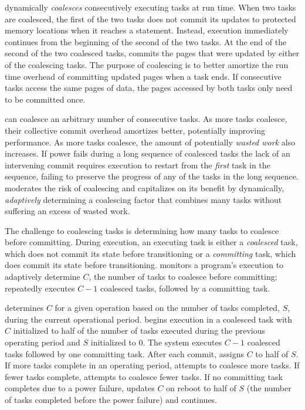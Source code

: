 \sys dynamically {\em coalesces} consecutively executing tasks at run time.
When two tasks are coalesced, the first of the two tasks does not commit its
updates to protected memory locations when it reaches a \transition statement.
Instead, execution immediately continues from the beginning of the second of
the two tasks. At the end of the second of the two coalesced tasks, \sys
commits the pages that were updated by either of the coalescing tasks. The
purpose of coalescing is to better amortize the run time overhead of committing
updated pages when a task ends. If consecutive tasks access the same pages of
data, the pages accessed by both tasks only need to be committed once.  

\sys can coalesce an arbitrary number of consecutive tasks. As more tasks
coalesce, their collective commit overhead amortizes better, potentially
improving performance. As more tasks coalesce, the amount of potentially {\em
wasted work} also increases. If power fails during a long sequence of coalesced
tasks the lack of an intervening commit requires execution to restart from the
{\em first} task in the sequence, failing to preserve the progress of any of
the tasks in the long sequence. \sys moderates the risk of coalescing and
capitalizes on its benefit by dynamically, \emph{adaptively} determining a
coalescing factor that combines many tasks without suffering an excess of
wasted work. 

The challenge to coalescing tasks is determining how many tasks to coalesce
before committing. During execution, an executing task is either a {\em
coalesced} task, which does not commit its state before transitioning or a {\em
committing} task, which does commit its state before transitioning. \sys
monitors a program's execution to adaptively determine $C$, the number of tasks
to coalesce before committing; \sys repeatedly executes $C-1$ coalesced tasks,
followed by a committing task. 

\sys determines $C$ for a given operation based on the number of tasks
completed, $S$, during the current operational period. \sys begins execution in
a coalesced task with $C$ initialized to half of the number of tasks executed
during the previous operating period and $S$ initialized to $0$. The system
executes $C-1$ coalesced tasks followed by one committing task. After each
commit, \sys assigns $C$ to half of $S$.   If more tasks complete in an
operating period, \sys attempts to coalesce more tasks. If fewer tasks
complete, \sys attempts to coalesce fewer tasks. If no committing task
completes due to a power failure, \sys updates $C$ on reboot to half of $S$
(the number of tasks completed before the power failure) and continues.

